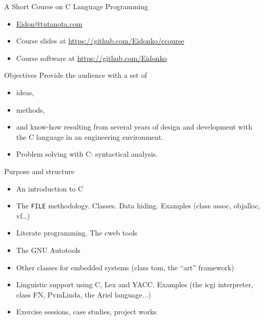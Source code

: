 \begin{frame}[fragile]{A Short Course on C Language Programming}
\begin{itemize}
\item \href{mailto:Eidon@tutanota.com}{Eidon@tutanota.com}
\item Course slides at \url{https://github.com/Eidonko/ccourse}
\item Course software at 
\url{https://github.com/Eidonko}
\end{itemize}
\end{frame}

\begin{frame}[fragile]{Objectives}
Provide the audience with a set of
\begin{itemize}
\item ideas,
\item methods,
\item and know-how
resulting from several years of design and development
with the C language in an engineering environment.

\item Problem solving with C: syntactical analysis.
\end{itemize}

\end{frame}
\begin{frame}[fragile]{Purpose and structure}
\begin{itemize}
\item An introduction to C
\item The \texttt{FILE} methodology. Classes. Data hiding.
      Examples (class assoc, objalloc, vf\ldots)
\item Literate programming. The cweb tools
\item The GNU Autotools
\item Other classes for embedded systems (class tom, the ``art'' framework)
\item Linguistic support using C, Lex and YACC.
      Examples (the icgi interpreter, class FN, PvmLinda,
      the Ariel language...)
\item Exercise sessions, case studies, project works
\end{itemize}



\end{frame}
